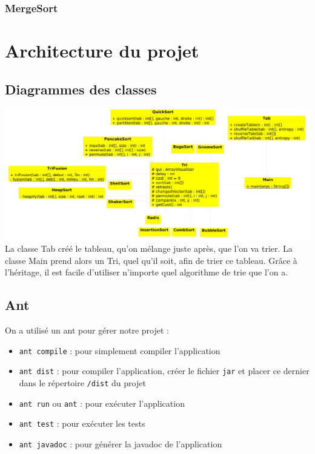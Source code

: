 \documentclass{article}
\begin{document}
\subsubsection{MergeSort}
    
    
\section{Architecture du projet}

\subsection{Diagrammes des classes}
    \includegraphics[scale=0.4]{Annexes/DiagramClass-1.png}
    \\La classe Tab créé le tableau, qu'on mélange juste après, que l'on va trier. La classe Main prend alors un Tri, quel qu'il soit, afin de trier ce tableau. Grâce à l'héritage, il est facile d'utiliser n'importe quel algorithme de trie que l'on a.

\subsection{Ant}

On a utilisé un ant pour gérer notre projet : 

\begin{itemize}
    \item \verb|ant compile| : pour simplement compiler l'application
    \item \verb|ant dist| : pour compiler l'application, créer le fichier \verb|jar| et placer ce dernier dans le répertoire \verb|/dist| du projet
    \item \verb|ant run| ou \verb|ant| : pour exécuter l'application
    \item \verb|ant test| : pour exécuter les tests
    \item \verb|ant javadoc| : pour générer la javadoc de l'application
\end{itemize} 
\end{document}
